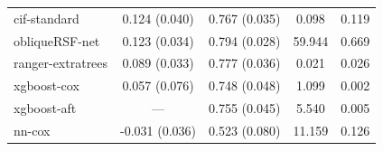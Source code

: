 \documentclass[twoside,11pt]{article}\usepackage[]{graphicx}\usepackage[]{xcolor}
\newenvironment{knitrout}{}{} %
\begin{document}
\begin{knitrout}
\begin{longtable}[t]{lcccc}
\hspace{1em}cif-standard & 0.124 (0.040) & 0.767 (0.035) & 0.098 & 0.119\\
\hspace{1em}obliqueRSF-net & 0.123 (0.034) & 0.794 (0.028) & 59.944 & 0.669\\
\hspace{1em}ranger-extratrees & 0.089 (0.033) & 0.777 (0.036) & 0.021 & 0.026\\
\hspace{1em}xgboost-cox & 0.057 (0.076) & 0.748 (0.048) & 1.099 & 0.002\\
\hspace{1em}xgboost-aft & --- & 0.755 (0.045) & 5.540 & 0.005\\
\hspace{1em}nn-cox & -0.031 (0.036) & 0.523 (0.080) & 11.159 & 0.126\\*
\end{longtable}

\end{knitrout}
\end{document}
